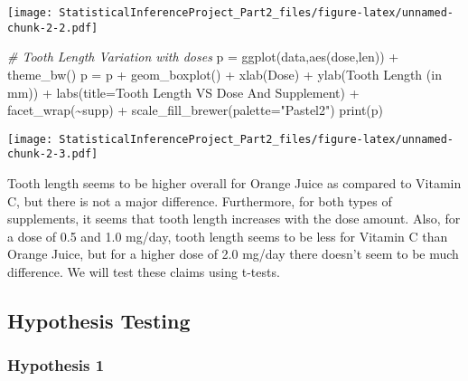 \documentclass[
]{article}
\newenvironment{Shaded}{\begin{snugshade}}{\end{snugshade}}
\newcommand{\AttributeTok}[1]{\textcolor[rgb]{0.77,0.63,0.00}{#1}}
\newcommand{\CommentTok}[1]{\textcolor[rgb]{0.56,0.35,0.01}{\textit{#1}}}
\newcommand{\FunctionTok}[1]{\textcolor[rgb]{0.00,0.00,0.00}{#1}}
\newcommand{\NormalTok}[1]{#1}
\newcommand{\OtherTok}[1]{\textcolor[rgb]{0.56,0.35,0.01}{#1}}
\newcommand{\SpecialCharTok}[1]{\textcolor[rgb]{0.00,0.00,0.00}{#1}}
\newcommand{\StringTok}[1]{\textcolor[rgb]{0.31,0.60,0.02}{#1}}
\begin{document}
\texttt{[image: StatisticalInferenceProject\_Part2\_files/figure-latex/unnamed-chunk-2-2.pdf]}

\begin{Shaded}
\begin{Highlighting}[]
\CommentTok{\# Tooth Length Variation with doses}
\NormalTok{p }\OtherTok{=} \FunctionTok{ggplot}\NormalTok{(data,}\FunctionTok{aes}\NormalTok{(dose,len)) }\SpecialCharTok{+} \FunctionTok{theme\_bw}\NormalTok{() }
\NormalTok{p }\OtherTok{=}\NormalTok{ p }\SpecialCharTok{+} \FunctionTok{geom\_boxplot}\NormalTok{() }\SpecialCharTok{+} \FunctionTok{xlab}\NormalTok{(}\StringTok{\textquotesingle{}Dose\textquotesingle{}}\NormalTok{) }\SpecialCharTok{+} \FunctionTok{ylab}\NormalTok{(}\StringTok{\textquotesingle{}Tooth Length (in mm)\textquotesingle{}}\NormalTok{) }\SpecialCharTok{+} 
  \FunctionTok{labs}\NormalTok{(}\AttributeTok{title=}\StringTok{\textquotesingle{}Tooth Length VS Dose And Supplement\textquotesingle{}}\NormalTok{) }\SpecialCharTok{+} \FunctionTok{facet\_wrap}\NormalTok{(}\SpecialCharTok{\textasciitilde{}}\NormalTok{supp) }\SpecialCharTok{+}
  \FunctionTok{scale\_fill\_brewer}\NormalTok{(}\AttributeTok{palette=}\StringTok{"Pastel2"}\NormalTok{)}
\FunctionTok{print}\NormalTok{(p)}
\end{Highlighting}
\end{Shaded}

\texttt{[image: StatisticalInferenceProject\_Part2\_files/figure-latex/unnamed-chunk-2-3.pdf]}

Tooth length seems to be higher overall for Orange Juice as compared to
Vitamin C, but there is not a major difference. Furthermore, for both
types of supplements, it seems that tooth length increases with the dose
amount. Also, for a dose of 0.5 and 1.0 mg/day, tooth length seems to be
less for Vitamin C than Orange Juice, but for a higher dose of 2.0
mg/day there doesn't seem to be much difference. We will test these
claims using t-tests.

\hypertarget{hypothesis-testing}{%
\subsection{Hypothesis Testing}\label{hypothesis-testing}}

\hypertarget{hypothesis-1}{%
\subsubsection{Hypothesis 1}\label{hypothesis-1}}
\end{document}
